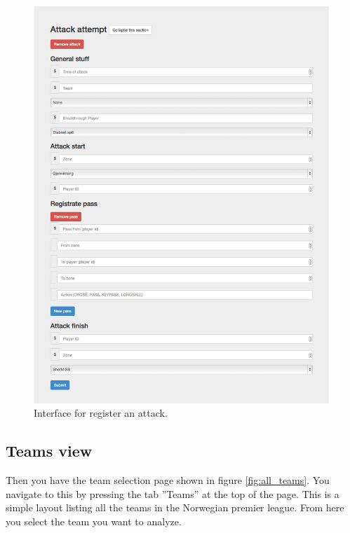 \begin{figure}[H]
\centering
\includegraphics[width=1\textwidth]{images/general/reg_attack.png}
\caption{Interface for register an attack.}
\label{fig:reg_attack}
\end{figure}

\subsection{Teams view}
Then you have the team selection page shown in figure \ref{fig:all_teams}. You navigate to this by pressing the tab ''Teams'' at the top of the page. This is a simple layout listing all the teams in the Norwegian premier league. From here you select the team you want to analyze.

